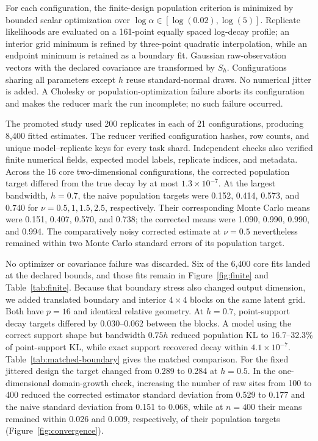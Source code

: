 \documentclass[11pt]{article}
\theoremstyle{remark}
\begin{document}
For each configuration, the finite-design population criterion is minimized by
bounded scalar optimization over
\(\log\alpha\in[\log(0.02),\log(5)]\).  Replicate likelihoods are evaluated on
a 161-point equally spaced log-decay profile; an interior grid minimum is
refined by three-point quadratic interpolation, while an endpoint minimum is
retained as a boundary fit.  Gaussian raw-observation vectors with the declared
covariance are transformed by \(S_h\).  Configurations sharing all parameters
except \(h\) reuse standard-normal draws.  No numerical jitter is added.  A
Cholesky or population-optimization failure aborts its configuration and makes
the reducer mark the run incomplete; no such failure occurred.

The promoted study used 200 replicates in each of 21 configurations, producing
8,400 fitted estimates.  The reducer verified configuration hashes, row counts,
and unique model--replicate keys for every task shard.  Independent checks also
verified finite numerical fields, expected model labels, replicate indices, and
metadata.
Across the 16 core two-dimensional configurations, the corrected population
target differed from the true decay by at most \(1.3\times10^{-7}\).  At the
largest bandwidth, \(h=0.7\), the naive population targets were 0.152, 0.414,
0.573, and 0.740 for \(\nu=0.5,1,1.5,2.5\), respectively.  Their corresponding
Monte Carlo means were 0.151, 0.407, 0.570, and 0.738; the corrected means were
1.090, 0.990, 0.990, and 0.994.  The comparatively noisy corrected estimate at
\(\nu=0.5\) nevertheless remained within two Monte Carlo standard errors of its
population target.

No optimizer or covariance failure was discarded.  Six of the 6,400 core fits
landed at the declared bounds, and those fits remain in Figure~\ref{fig:finite}
and Table~\ref{tab:finite}. Because that boundary stress also changed output
dimension, we added translated boundary and interior \(4\times4\) blocks on
the same latent grid. Both have \(p=16\) and identical relative geometry. At
\(h=0.7\), point-support decay targets differed by 0.030--0.062 between the
blocks. A model using the correct support shape but bandwidth \(0.75h\) reduced
population KL to 16.7--32.3\% of point-support KL, while exact support recovered
decay within \(4.1\times10^{-7}\). Table~\ref{tab:matched-boundary} gives the
matched comparison. For the fixed jittered design the target changed from
0.289 to 0.284 at \(h=0.5\). In the one-dimensional domain-growth check, increasing the
number of raw sites from 100 to 400 reduced the corrected estimator standard
deviation from 0.529 to 0.177 and the naive standard deviation from 0.151 to
0.068, while at \(n=400\) their means remained within 0.026 and 0.009,
respectively, of their population targets
(Figure~\ref{fig:convergence}).
\end{document}
